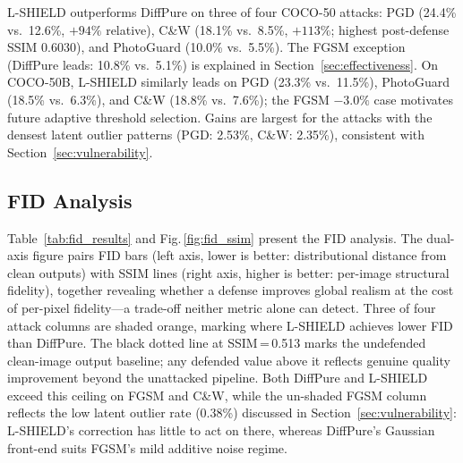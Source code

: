\documentclass[conference]{IEEEtran}
\begin{document}
L-SHIELD outperforms DiffPure on three of four COCO-50 attacks: PGD
(24.4\% vs.\ 12.6\%, $+94\%$ relative), C\&W (18.1\% vs.\ 8.5\%, $+113\%$;
highest post-defense SSIM 0.6030), and PhotoGuard (10.0\% vs.\ 5.5\%).
The FGSM exception (DiffPure leads: 10.8\% vs.\ 5.1\%) is explained in
Section~\ref{sec:effectiveness}. On COCO-50B, L-SHIELD similarly leads on PGD
(23.3\% vs.\ 11.5\%), PhotoGuard (18.5\% vs.\ 6.3\%), and C\&W (18.8\%
vs.\ 7.6\%); the FGSM $-3.0\%$ case motivates future adaptive threshold
selection. Gains are largest for the attacks with the densest latent outlier
patterns (PGD: 2.53\%, C\&W: 2.35\%), consistent with Section~\ref{sec:vulnerability}.

\subsection{FID Analysis}
\enlargethispage{25pt}


Table~\ref{tab:fid_results} and Fig.\,\ref{fig:fid_ssim} present the FID
analysis. The dual-axis figure pairs FID bars (left axis, lower is better:
distributional distance from clean outputs) with SSIM lines (right axis,
higher is better: per-image structural fidelity), together revealing whether
a defense improves global realism at the cost of per-pixel fidelity---a
trade-off neither metric alone can detect. Three of four attack columns are
shaded orange, marking where L-SHIELD achieves lower FID than DiffPure.
The black dotted line at SSIM\,=\,0.513 marks the undefended clean-image
output baseline; any defended value above it reflects genuine quality
improvement beyond the unattacked pipeline. Both DiffPure and L-SHIELD
exceed this ceiling on FGSM and C\&W, while the un-shaded FGSM column
reflects the low latent outlier rate (0.38\%) discussed in
Section~\ref{sec:vulnerability}: L-SHIELD's correction has little to act on
there, whereas DiffPure's Gaussian front-end suits FGSM's mild additive
noise regime.
\end{document}
